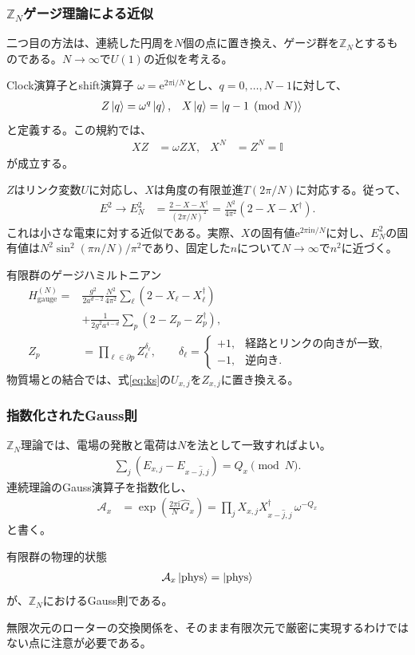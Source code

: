 \documentclass[a4paper,10.5pt]{article}
\numberwithin{equation}{section}
\providecommand{\ii}{\mathrm{i}}
\providecommand{\ee}{\mathrm{e}}
\providecommand{\id}{\mathbb{I}}
\begin{document}
\subsubsection{$\mathbb Z_N$ゲージ理論による近似}
二つ目の方法は、連続した円周を$N$個の点に置き換え、ゲージ群を$\mathbb Z_N$とするものである。$N\to\infty$で$U(1)$の近似を考える。
\begin{defbox}{Clock演算子とshift演算子}
$\omega=\ee^{2\pi\ii/N}$とし、$q=0,\ldots,N-1$に対して、
\begin{align}
Z\ket q&=\omega^q\ket q,&
X\ket q&=\ket{q-1\pmod N}
\end{align}
と定義する。この規約では、
\begin{align}
XZ&=\omega ZX,&X^N&=Z^N=\id
\end{align}
が成立する。
\end{defbox}
$Z$はリンク変数$U$に対応し、$X$は角度の有限並進$T(2\pi/N)$に対応する。従って、
\begin{align}
E^2\longrightarrow E_N^2
&=\frac{2-X-X^\dagger}{(2\pi/N)^2}
=\frac{N^2}{4\pi^2}(2-X-X^\dagger).
\end{align}
これは小さな電束に対する近似である。実際、$X$の固有値$\ee^{2\pi\ii n/N}$に対し、$E_N^2$の固有値は$N^2\sin^2(\pi n/N)/\pi^2$であり、固定した$n$について$N\to\infty$で$n^2$に近づく。
\begin{defbox}{有限群のゲージハミルトニアン}
\begin{align}
H_{\mathrm{gauge}}^{(N)}
={}&\frac{g^2}{2a^{d-2}}\frac{N^2}{4\pi^2}
 \sum_\ell(2-X_\ell-X_\ell^\dagger)\\
&+\frac1{2g^2a^{4-d}}\sum_p(2-Z_p-Z_p^\dagger),\\
Z_p&=\prod_{\ell\in\partial p}Z_\ell^{\delta_\ell},\qquad
\delta_\ell=\begin{cases}+1,&\text{経路とリンクの向きが一致},\\-1,&\text{逆向き}.\end{cases}
\end{align}
物質場との結合では、式\eqref{eq:ks}の$U_{x,j}$を$Z_{x,j}$に置き換える。
\end{defbox}

\subsubsection{指数化されたGauss則}
$\mathbb Z_N$理論では、電場の発散と電荷は$N$を法として一致すればよい。
\begin{align}
\sum_j(E_{x,j}-E_{x-\hat j,j})=Q_x\pmod N.
\end{align}
連続理論のGauss演算子を指数化し、
\begin{align}
\mathcal A_x
&=\exp\left(\frac{2\pi\ii}N\widehat G_x\right)
=\prod_jX_{x,j}X_{x-\hat j,j}^\dagger\,\omega^{-Q_x}
\end{align}
と書く。
\begin{resultbox}{有限群の物理的状態}
\begin{align}
\mathcal A_x\ket{\mathrm{phys}}=\ket{\mathrm{phys}}
\end{align}
が、$\mathbb Z_N$におけるGauss則である。
\end{resultbox}
無限次元のローターの交換関係を、そのまま有限次元で厳密に実現するわけではない点に注意が必要である。
\end{document}
